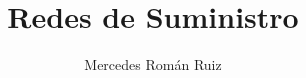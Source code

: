 \documentclass[10pt, a4paper, twoside, twocolumn]{book}
\title{Redes de Suministro}
\author{Mercedes Román Ruiz}
\date{}
\begin{document}
\sloppy 
\setlength{\parindent}{15pt} %
\setlength{\parskip}{5pt} %
\renewcommand\thesection{\arabic{section}}
\renewcommand{\baselinestretch}{1.5}
\renewcommand{\listtablename}{Índice de tablas} %
\renewcommand{\tablename}{Tabla} %
\renewcommand{\baselinestretch}{1.5}

\fancyhead{}
\fancyfoot{}
\pagestyle{fancy}
\chead[\rightmark]{\leftmark}

\fancyfoot[LE,RO]{\thepage}



%

%



\end{document}
